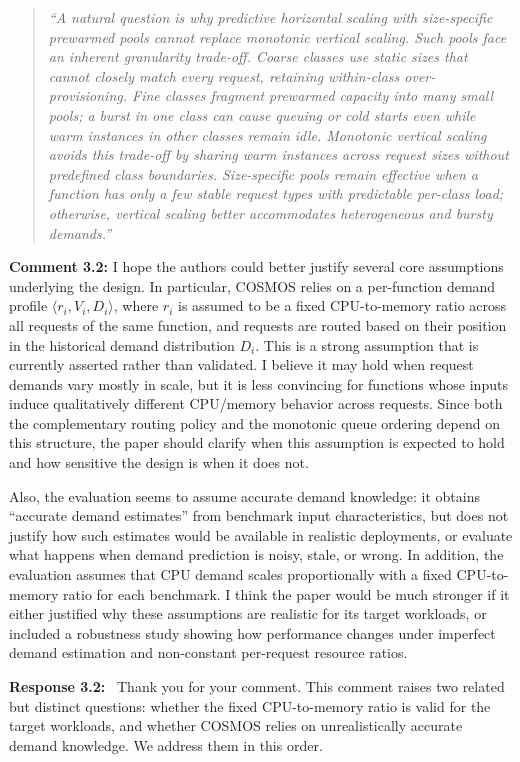 \documentclass[11pt]{article}
\newcommand{\response}[1]{\par\medskip\noindent\textbf{Response #1:}\ }
\newenvironment{revisionquote}{\begin{quote}\itshape}{\end{quote}}
\begin{document}
\begin{revisionquote}
``A natural question is why predictive horizontal scaling with size-specific prewarmed pools cannot replace monotonic vertical scaling. Such pools face an inherent granularity trade-off. Coarse classes use static sizes that cannot closely match every request, retaining within-class over-provisioning. Fine classes fragment prewarmed capacity into many small pools; a burst in one class can cause queuing or cold starts even while warm instances in other classes remain idle. Monotonic vertical scaling avoids this trade-off by sharing warm instances across request sizes without predefined class boundaries. Size-specific pools remain effective when a function has only a few stable request types with predictable per-class load; otherwise, vertical scaling better accommodates heterogeneous and bursty demands.''
\end{revisionquote}

\begin{reviewcomment}
\textbf{Comment 3.2:} I hope the authors could better justify several core assumptions underlying the design. In particular, COSMOS relies on a per-function demand profile $\langle r_i,V_i,D_i\rangle$, where $r_i$ is assumed to be a fixed CPU-to-memory ratio across all requests of the same function, and requests are routed based on their position in the historical demand distribution $D_i$. This is a strong assumption that is currently asserted rather than validated. I believe it may hold when request demands vary mostly in scale, but it is less convincing for functions whose inputs induce qualitatively different CPU/memory behavior across requests. Since both the complementary routing policy and the monotonic queue ordering depend on this structure, the paper should clarify when this assumption is expected to hold and how sensitive the design is when it does not.

Also, the evaluation seems to assume accurate demand knowledge: it obtains ``accurate demand estimates'' from benchmark input characteristics, but does not justify how such estimates would be available in realistic deployments, or evaluate what happens when demand prediction is noisy, stale, or wrong. In addition, the evaluation assumes that CPU demand scales proportionally with a fixed CPU-to-memory ratio for each benchmark. I think the paper would be much stronger if it either justified why these assumptions are realistic for its target workloads, or included a robustness study showing how performance changes under imperfect demand estimation and non-constant per-request resource ratios.
\end{reviewcomment}
\response{3.2} Thank you for your comment. This comment raises two related but distinct questions: whether the fixed CPU-to-memory ratio is valid for the target workloads, and whether COSMOS relies on unrealistically accurate demand knowledge. We address them in this order.
\end{document}
